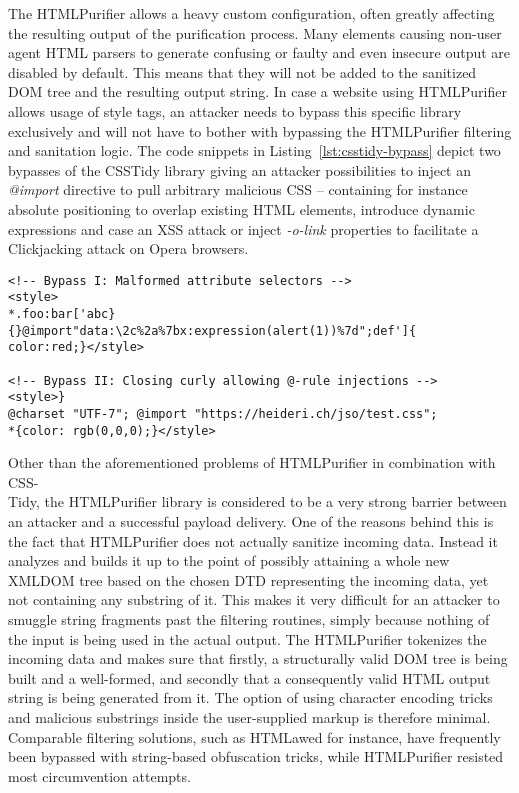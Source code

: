       The HTMLPurifier allows a heavy custom configuration, often greatly affecting the resulting output of the purification process. Many elements causing non-user agent HTML parsers to generate confusing or faulty and even insecure output are disabled by default. This means that they will not be added to the sanitized DOM tree and the resulting output string. In case a website using HTMLPurifier allows usage of style tags, an attacker needs to bypass this specific library exclusively and will not have to bother with bypassing the HTMLPurifier filtering and sanitation logic. The code snippets in Listing~\ref{lst:csstidy-bypass} depict two bypasses of the CSSTidy library giving an attacker possibilities to inject an \textit{@import} directive to pull arbitrary malicious CSS -- containing for instance absolute positioning to overlap existing HTML elements, introduce dynamic expressions and case an XSS attack or inject \textit{-o-link} properties to facilitate a Clickjacking attack on Opera browsers. \\

\begin{lstlisting}[label=lst:csstidy-bypass,caption=Examples for potential XSS vectors bypassing CSSTidy; note the URL encoding, which is necessary to allow MSIE to use data URIs in CSS,captionpos=b]
<!-- Bypass I: Malformed attribute selectors -->
<style>
*.foo:bar['abc}{}@import"data:\2c%2a%7bx:expression(alert(1))%7d";def']{
color:red;}</style>

<!-- Bypass II: Closing curly allowing @-rule injections -->
<style>}
@charset "UTF-7"; @import "https://heideri.ch/jso/test.css";
*{color: rgb(0,0,0);}</style>
\end{lstlisting}

      Other than the aforementioned problems of HTMLPurifier in combination with CSS-\\
Tidy, the HTMLPurifier library is considered to be a very strong barrier between an attacker and a successful payload delivery. One of the reasons behind this is the fact that HTMLPurifier does not actually sanitize incoming data. Instead it analyzes and builds it up to the point of possibly attaining a whole new XMLDOM tree based on the chosen DTD representing the incoming data, yet not containing any substring of it. This makes it very difficult for an attacker to smuggle string fragments past the filtering routines, simply because nothing of the input is being used in the actual output. The HTMLPurifier tokenizes the incoming data and makes sure that firstly, a structurally valid DOM tree is being built and a well-formed, and secondly that a consequently valid HTML output string is being generated from it. The option of using character encoding tricks and malicious substrings inside the user-supplied markup is therefore minimal. Comparable filtering solutions, such as HTMLawed for instance, have 
frequently been bypassed with string-based obfuscation tricks, while HTMLPurifier resisted most circumvention attempts. \\

